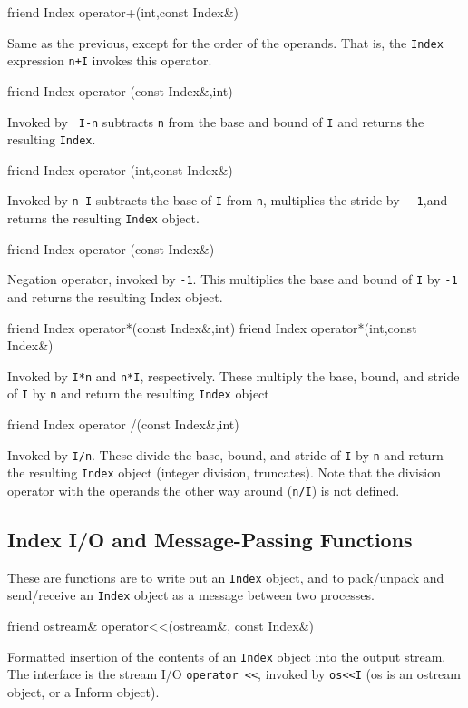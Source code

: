 \begin{smallcode}
friend Index operator+(int,const Index&) 
\end{smallcode}
Same as the previous, except for the order of the operands. That is, the \texttt{Index} expression \texttt{n+I} invokes this operator. 

\begin{smallcode}
friend Index operator-(const Index&,int) 
\end{smallcode}
Invoked by \texttt{ I-n} subtracts \texttt{n} from the base and bound of \texttt{I} and returns the resulting \texttt{Index}. 
\begin{smallcode}
friend Index operator-(int,const Index&) 
\end{smallcode}
Invoked by \texttt{n-I} subtracts the base of \texttt{I} from \texttt{n}, multiplies the stride by \texttt{ -1},and returns the 
	resulting \texttt{Index} object.

\begin{smallcode}
friend Index operator-(const Index&) 
\end{smallcode}
Negation operator, invoked by \texttt{-1}. This multiplies the base and bound of \texttt{I} by \texttt{-1} and returns the resulting Index object. 
\begin{smallcode}
friend Index operator*(const Index&,int) 
friend Index operator*(int,const Index&) 
\end{smallcode}

Invoked by \texttt{I*n} and \texttt{n*I}, respectively. These multiply the base, bound, and stride of \texttt{I} by \texttt{n} and return the resulting \texttt{Index} object 
\begin{smallcode}
friend Index operator /(const Index&,int) 
\end{smallcode}
Invoked by \texttt{I/n}. These divide the base, bound, and stride of \texttt{I} by \texttt{n} and return the resulting \texttt{Index} object (integer division, truncates). 
Note that the division operator with the operands the other way around (\texttt{n/I}) is not defined.

\subsection{Index I/O and Message-Passing Functions}
These are functions are to write out an \texttt{Index} object, and to pack/unpack and send/receive an \texttt{Index} object as a message between two processes. 
\begin{smallcode}
friend ostream& operator<<(ostream&, const Index&) 
\end{smallcode}
Formatted insertion of the contents of an \texttt{Index} object into the output stream. The interface is the stream I/O  \texttt{operator <<}, invoked by \texttt{os<<I} (os is an ostream object, or a \ippl Inform object).

